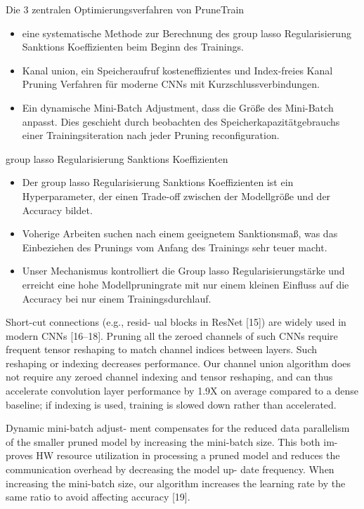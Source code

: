 \documentclass[10pt]{beamer}
\begin{document}
\begin{frame}{Die 3 zentralen Optimierungsverfahren von PruneTrain}
  \begin{itemize}
   \item eine systematische Methode zur Berechnung des group lasso Regularisierung Sanktions Koeffizienten beim Beginn des Trainings.
   \item Kanal union, ein Speicheraufruf kosteneffizientes und Index-freies Kanal Pruning Verfahren für moderne CNNs mit Kurzschlussverbindungen.
   \item Ein dynamische Mini-Batch Adjustment, dass die Größe des Mini-Batch anpasst. Dies geschieht durch beobachten des Speicherkapazitätgebrauchs einer Trainingsiteration nach jeder Pruning reconfiguration.
  \end{itemize} 
  \end{frame}


\begin{frame}{group lasso Regularisierung Sanktions Koeffizienten}
\begin{itemize}
 \item Der group lasso Regularisierung Sanktions Koeffizienten ist ein Hyperparameter, der einen Trade-off  zwischen der Modellgröße und der Accuracy bildet.
 \item Voherige Arbeiten suchen nach einem geeignetem Sanktionsmaß, was das Einbeziehen des Prunings vom Anfang des Trainings sehr teuer macht.
 \item Unser Mechanismus kontrolliert die Group lasso Regularisierungstärke und erreicht eine hohe Modellpruningrate mit nur einem kleinen Einfluss auf die Accuracy bei nur einem Trainingsdurchlauf.
\end{itemize}
\end{frame}


\begin{frame}{}
  Short-cut connections (e.g., resid-
ual blocks in ResNet [15]) are widely used in modern CNNs [16–18].
Pruning all the zeroed channels of such CNNs require frequent
tensor reshaping to match channel indices between layers. Such
reshaping or indexing decreases performance. Our channel union
algorithm does not require any zeroed channel indexing and tensor
reshaping, and can thus accelerate convolution layer performance
by 1.9X on average compared to a dense baseline; if indexing is
used, training is slowed down rather than accelerated.

\end{frame}

\begin{frame}{}
 Dynamic mini-batch adjust-
ment compensates for the reduced data parallelism of the smaller
pruned model by increasing the mini-batch size. This both im-
proves HW resource utilization in processing a pruned model and
reduces the communication overhead by decreasing the model up-
date frequency. When increasing the mini-batch size, our algorithm
increases the learning rate by the same ratio to avoid affecting
accuracy [19].

\end{frame}
\end{document}
